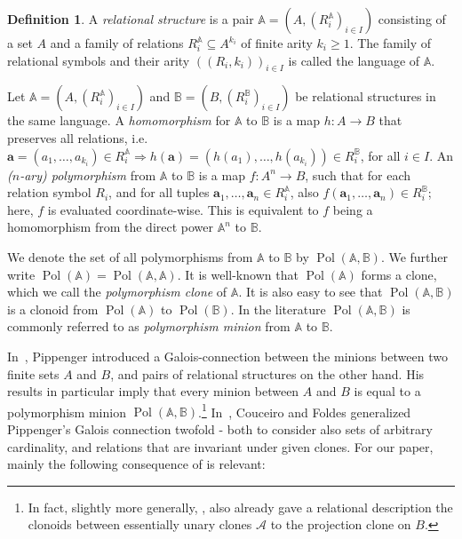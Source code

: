 \documentclass[11pt]{amsart}
\theoremstyle{plain}
\theoremstyle{definition}
\newtheorem{definition}[thm]{Definition}
\DeclareMathOperator{\Pol}{Pol}
\newcommand{\clone}[1]{\mathcal{#1}}
\newcommand{\cloA}{\clone{A}}
\renewcommand\vec{\mathbf}
\newcommand{\va}{\vec{a}}
\begin{document}
\begin{definition}
A \emph{relational structure} is a pair $\mathbb{A} = (A, (R_i^{\mathbb{A}})_{i \in I})$ consisting of a set $A$ and a family of relations $R^{\mathbb{A}}_i \subseteq A^{k_i}$ of finite arity $k_i \geq 1$. The family of relational symbols and their arity $((R_i,k_i))_{i\in I}$ is called the language of $\mathbb A$.

Let $\mathbb{A} = (A, (R_i^{\mathbb{A}})_{i \in I})$ and $\mathbb{B} = (B, (R_i^{\mathbb{B}})_{i \in I})$ be relational structures in the same language. A \emph{homomorphism} for $\mathbb A$ to $\mathbb B$ is a map $h\colon A \to B$ that preserves all relations, i.e. $\va = (a_1,\ldots,a_{k_i}) \in R_i^{\mathbb A} \Rightarrow h(\va) = (h(a_1),\ldots,h(a_{k_i})) \in R_i^{\mathbb B}$, for all $i\in I$. An \emph{($n$-ary) polymorphism} from $\mathbb{A}$ to $\mathbb{B}$ is a map $f\colon A^n \to B$, such that for each relation symbol $R_i$, and for all tuples $\va_1, \ldots,\va_n \in R_i^{\mathbb A}$, also $f(\va_1, \ldots,\va_n) \in R_i^{\mathbb B}$; here, $f$ is evaluated coordinate-wise. This is equivalent to $f$ being a homomorphism from the direct power $\mathbb A^n$ to $\mathbb B$.

We denote the set of all polymorphisms from $\mathbb A$ to $\mathbb B$ by $\Pol(\mathbb A, \mathbb B)$. We further write $\Pol(\mathbb A) = \Pol(\mathbb A, \mathbb A)$. It is well-known that $\Pol(\mathbb A)$ forms a clone, which we call the \emph{polymorphism clone} of $\mathbb A$. It is also easy to see that $\Pol(\mathbb A, \mathbb B)$ is a clonoid from $\Pol(\mathbb A)$ to $\Pol(\mathbb B)$. In the literature $\Pol(\mathbb A, \mathbb B)$ is commonly referred to as \emph{polymorphism minion} from $\mathbb A$ to $\mathbb B$.
\end{definition}

In~\cite{pippenger-minions}, Pippenger introduced a Galois-connection between the minions between two finite sets $A$ and $B$, and pairs of relational structures on the other hand. His results in particular imply that every minion between $A$ and $B$ is equal to a polymorphism minion $\Pol(\mathbb A,\mathbb B)$.\footnote{In fact, slightly more generally, \cite[Section 3]{pippenger-minions}, also already gave a relational description the clonoids between essentially unary clones $\cloA$ to the projection clone on $B$.} In~\cite{CF-clonoids}, Couceiro and Foldes generalized Pippenger's Galois connection twofold - both to consider also sets of arbitrary cardinality, and relations that are invariant under given clones. For our paper, mainly the following consequence of \cite[Theorem 3]{CF-clonoids} is relevant:
\end{document}
